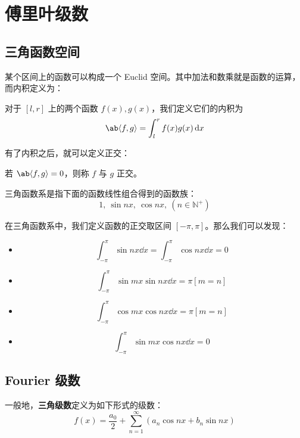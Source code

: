 \section{傅里叶级数}

\subsection{三角函数空间}

某个区间上的函数可以构成一个 Euclid 空间。其中加法和数乘就是函数的运算，而内积定义为：

\begin{definition}[函数的内积]
    对于 $[l, r]$ 上的两个函数 $f(x), g(x)$，我们定义它们的内积为
    $$
    \ab\langle f, g \rangle = \int_l^r f(x) g(x) \dd{x}
    $$
\end{definition}

有了内积之后，就可以定义正交：

\begin{definition}[正交]
    若 $\ab\langle f, g \rangle = 0$，则称 $f$ 与 $g$ 正交。
\end{definition}

三角函数系是指下面的函数线性组合得到的函数族：
$$
1,\ \sin n x,\ \cos n x,\ (n \in \mathbb{N}^+)
$$

在三角函数系中，我们定义函数的正交取区间 $[-\pi, \pi]$。那么我们可以发现：

\begin{itemize}
    \item
    $$
    \int_{-\pi}^{\pi} \sin n x \dd{x} = \int_{-\pi}^{\pi} \cos n x \dd{x} = 0
    $$
    \item
    $$
    \int_{-\pi}^{\pi} \sin m x \sin n x \dd{x} = \pi [m = n]
    $$
    \item
    $$
    \int_{-\pi}^{\pi} \cos m x \cos n x \dd{x} = \pi [m = n]
    $$
    \item
    $$
    \int_{-\pi}^{\pi} \sin m x \cos n x \dd{x} = 0
    $$
\end{itemize}

\subsection{Fourier 级数}

\begin{definition}
    一般地，\textbf{三角级数}定义为如下形式的级数：
    $$
    f(x) = \frac{a_0}{2} + \sum_{n=1}^{\infty} (a_n \cos n x + b_n \sin n x)
    $$
\end{definition}

